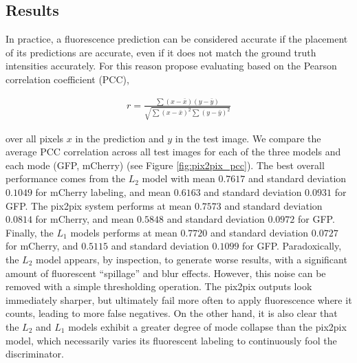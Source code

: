 \subsection{Results}

In practice, a fluorescence prediction can be considered accurate if the placement of its predictions are accurate, even if it does not match the ground truth intensities accurately. For this reason \cite{ounkomol2018label} propose evaluating based on the Pearson correlation coefficient (PCC),

\begin{align}
r = \frac{\sum (x - \bar{x})(y - \bar{y})}{\sqrt{\sum (x - \bar{x})^2\sum (y - \bar{y})^2}}
\end{align}

over all pixels $x$ in the prediction and $y$ in the test image. We compare the average PCC correlation across all test images for each of the three models and each mode (GFP, mCherry) (see Figure \ref{fig:pix2pix_pcc}). The best overall performance comes from the $L_2$ model with mean $0.7617$ and standard deviation $0.1049$ for mCherry labeling, and mean $0.6163$ and standard deviation $0.0931$ for GFP. The pix2pix system performs at mean $0.7573$ and standard deviation $0.0814$ for mCherry, and mean $0.5848$ and standard deviation $0.0972$ for GFP. Finally, the $L_1$ models performs at mean $0.7720$ and standard deviation $0.0727$ for mCherry, and $0.5115$ and standard deviation $0.1099$ for GFP. Paradoxically, the $L_2$ model appears, by inspection, to generate worse results, with a significant amount of fluorescent ``spillage'' and blur effects. However, this noise can be removed with a simple thresholding operation. The pix2pix outputs look immediately sharper, but ultimately fail more often to apply fluorescence where it counts, leading to more false negatives. On the other hand, it is also clear that the $L_2$ and $L_1$ models exhibit a greater degree of mode collapse than the pix2pix model, which necessarily varies its fluorescent labeling to continuously fool the discriminator.


